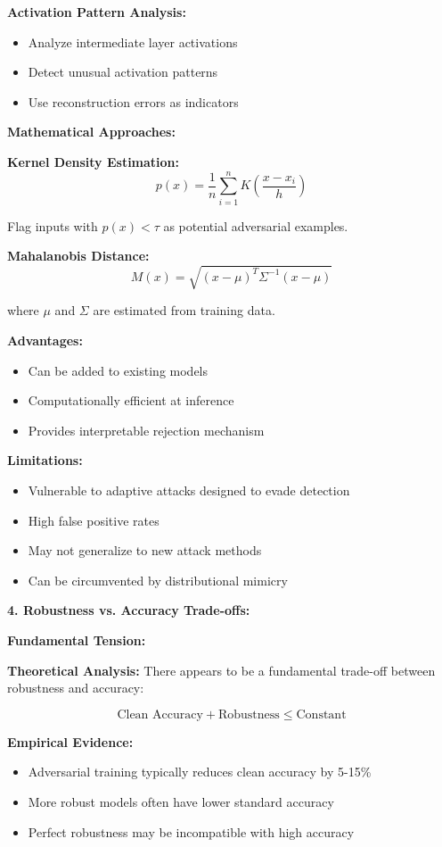\documentclass[12pt]{article}
\begin{document}
\begin{enumerate}[(a)]
{    \textbf{Activation Pattern Analysis:}
    \begin{itemize}
        \item Analyze intermediate layer activations
        \item Detect unusual activation patterns
        \item Use reconstruction errors as indicators
    \end{itemize}
    
    \textbf{Mathematical Approaches:}
    
    \textbf{Kernel Density Estimation:}
    $$p(x) = \frac{1}{n} \sum_{i=1}^n K\left(\frac{x - x_i}{h}\right)$$
    
    Flag inputs with $p(x) < \tau$ as potential adversarial examples.
    
    \textbf{Mahalanobis Distance:}
    $$M(x) = \sqrt{(x - \mu)^T \Sigma^{-1} (x - \mu)}$$
    
    where $\mu$ and $\Sigma$ are estimated from training data.
    
    \textbf{Advantages:}
    \begin{itemize}
        \item Can be added to existing models
        \item Computationally efficient at inference
        \item Provides interpretable rejection mechanism
    \end{itemize}
    
    \textbf{Limitations:}
    \begin{itemize}
        \item Vulnerable to adaptive attacks designed to evade detection
        \item High false positive rates
        \item May not generalize to new attack methods
        \item Can be circumvented by distributional mimicry
    \end{itemize}
    
    \textbf{4. Robustness vs. Accuracy Trade-offs:}
    
    \textbf{Fundamental Tension:}
    
    \textbf{Theoretical Analysis:}
    There appears to be a fundamental trade-off between robustness and accuracy:
    
    $$\text{Clean Accuracy} + \text{Robustness} \leq \text{Constant}$$
    
    \textbf{Empirical Evidence:}
    \begin{itemize}
        \item Adversarial training typically reduces clean accuracy by 5-15\%
        \item More robust models often have lower standard accuracy
        \item Perfect robustness may be incompatible with high accuracy
    \end{itemize}
    
}
\end{enumerate}
\end{document}
